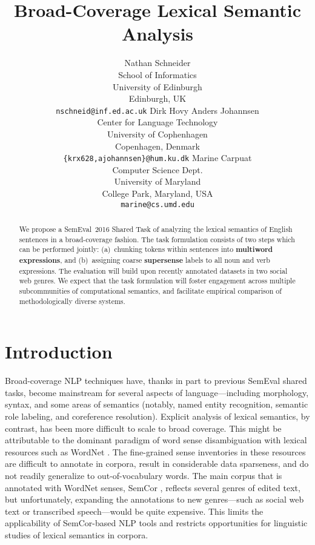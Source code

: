 \documentclass[11pt]{article}
\title{\draftnotice Broad-Coverage Lexical Semantic Analysis}
\author{
Nathan Schneider \\
		School of Informatics\\
	   	University of Edinburgh\\
	    Edinburgh, UK\\
	    {\tt nschneid@inf.ed.ac.uk} \And
Dirk Hovy \quad Anders Johannsen\\
Center for Language Technology\\
University of Cophenhagen\\
Copenhagen, Denmark\\
{\tt \{krx628,ajohannsen\}@hum.ku.dk} \And
Marine Carpuat\\
Computer Science Dept.\\
University of Maryland\\
College Park, Maryland, USA\\
{\tt marine@cs.umd.edu}}
\date{}
\newcommand{\ensuretext}[1]{#1}
\newcommand{\nssmarker}{\ensuretext{\textcolor{magenta}{\ensuremath{^{\textsc{NS}}_{\textsc{S}}}}}}
\newcommand{\arkcomment}[3]{\ensuretext{\textcolor{#3}{[#1 #2]}}}
\newcommand{\nss}[1]{\arkcomment{\nssmarker}{#1}{magenta}}
\newcommand{\longversion}[1]{#1} %
\begin{document}
\maketitle

\begin{abstract}
We propose a SemEval~2016 Shared Task 
of analyzing the lexical semantics of English sentences 
in a broad-coverage fashion. 
The task formulation consists of two steps which can be performed jointly:
(a)~chunking tokens within sentences into \textbf{multiword expressions}, and 
(b)~assigning coarse \textbf{supersense} labels to all noun and verb expressions. 
The evaluation will build upon recently annotated datasets in two social web genres.
\longversion{We expect that the task formulation will foster engagement across 
multiple subcommunities of computational semantics, 
and facilitate empirical comparison of methodologically diverse systems.}
\end{abstract}

\section{Introduction}\label{sec:intro}

Broad-coverage NLP techniques have, thanks in part to previous SemEval shared tasks, 
become mainstream for several aspects of language---including morphology, syntax, 
and some areas of semantics (notably, named entity recognition, %
semantic role labeling, %
and coreference resolution). %
Explicit analysis of lexical semantics, by contrast, has been more difficult to scale 
to broad coverage. %
This might be attributable to the dominant paradigm of word sense disambiguation 
with lexical resources such as WordNet \citep{wordnet}.
The fine-grained sense inventories in these resources 
are difficult to annotate in corpora, result in considerable data sparseness, 
and do not readily generalize to out-of-vocabulary words.
The main corpus that is annotated with WordNet senses, 
SemCor \citep{semcor}, reflects several genres of edited text, but
unfortunately, expanding the annotations to new genres---such as social web text 
or transcribed speech---would be quite expensive.
This limits the applicability of SemCor-based NLP tools 
and restricts opportunities for linguistic studies of lexical semantics in corpora.
\end{document}
